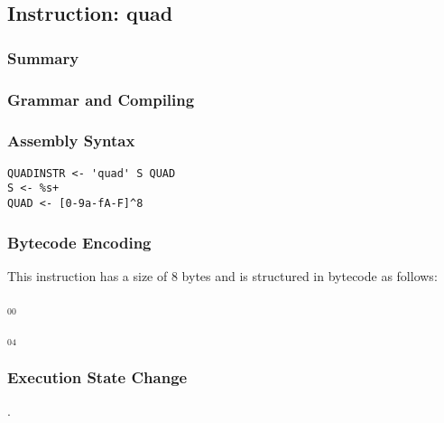 \subsection{Instruction: quad}

\subsubsection{Summary}


\subsubsection{Grammar and Compiling}


\subsubsection{Assembly Syntax}

\begin{myquote}
\begin{verbatim}
QUADINSTR <- 'quad' S QUAD
S <- %s+
QUAD <- [0-9a-fA-F]^8
\end{verbatim}
\end{myquote}


\subsubsection{Bytecode Encoding}

This instruction has a size of 8 bytes and is structured in bytecode as follows:

$_{00}$\ 



$_{04}$\ 


\subsubsection{Execution State Change}

.


